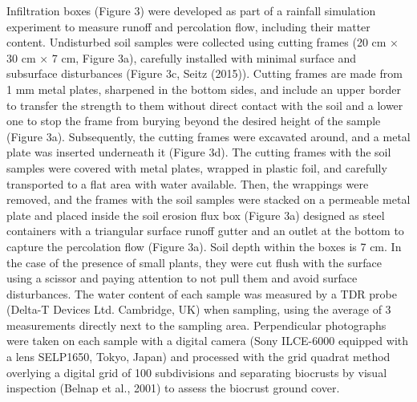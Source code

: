 Infiltration boxes (Figure 3) were developed as part of a rainfall simulation experiment to measure runoff and percolation flow, including their matter content. Undisturbed soil samples were collected using cutting frames (20 cm × 30 cm × 7 cm, Figure 3a), carefully installed with minimal surface and subsurface disturbances (Figure 3c, Seitz (2015)). Cutting frames are made from 1 mm metal plates, sharpened in the bottom sides, and include an upper border to transfer the strength to them without direct contact with the soil and a lower one to stop the frame from burying beyond the desired height of the sample (Figure 3a). Subsequently, the cutting frames were excavated around, and a metal plate was inserted underneath it (Figure 3d). The cutting frames with the soil samples were covered with metal plates, wrapped in plastic foil, and carefully transported to a flat area with water available. Then, the wrappings were removed, and the frames with the soil samples were stacked on a permeable metal plate and placed inside the soil erosion flux box (Figure 3a) designed as steel containers with a triangular surface runoff gutter and an outlet at the bottom to capture the percolation flow (Figure 3a). Soil depth within the boxes is 7 cm. In the case of the presence of small plants, they were cut flush with the surface using a scissor and paying attention to not pull them and avoid surface disturbances. The water content of each sample was measured by a TDR probe (Delta-T Devices Ltd. Cambridge, UK) when sampling, using the average of 3 measurements directly next to the sampling area. Perpendicular photographs were taken on each sample with a digital camera (Sony ILCE-6000 equipped with a lens SELP1650, Tokyo, Japan) and processed with the grid quadrat method overlying a digital grid of 100 subdivisions and separating biocrusts by visual inspection (Belnap et al., 2001) to assess the biocrust ground cover.

